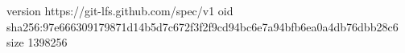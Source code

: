 version https://git-lfs.github.com/spec/v1
oid sha256:97e666309179871d14b5d7c672f3f2f9cd94bc6e7a94bfb6ea0a4db76dbb28c6
size 1398256
